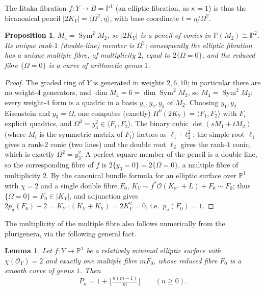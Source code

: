 \documentclass[11pt]{article}
\newtheorem{proposition}[theorem]{Proposition}
\newtheorem{lemma}[theorem]{Lemma}
\theoremstyle{definition}
\DeclareMathOperator{\Sym}{Sym}
\newcommand{\bP}{\mathbb{P}}
\newcommand{\cO}{\mathcal{O}}
\newcommand{\Om}{\Omega}
\begin{document}
The Iitaka fibration $f\colon Y\to B=\bP^1$ (an elliptic fibration, as
$\kappa=1$) is thus the bicanonical pencil $|2K_Y|=\langle\Om^2,\eta\rangle$,
with base coordinate $t=\eta/\Om^2$.

\begin{proposition}\label{prop:fibration}
$M_4=\Sym^2 M_2$, so $|2K_Y|$ is a pencil of conics in $\bP(M_2)\cong\bP^2$.
Its unique rank-$1$ (double-line) member is $\Om^2$; consequently the elliptic
fibration has a unique multiple fibre, of multiplicity $2$, equal to
$2\{\Om=0\}$, and the reduced fibre $\{\Om=0\}$ is a curve of arithmetic genus
$1$.
\end{proposition}

\begin{proof}
The graded ring of $Y$ is generated in weights $2,6,10$; in particular there
are no weight-$4$ generators, and $\dim M_4=6=\dim\Sym^2 M_2$, so
$M_4=\Sym^2M_2$: every weight-$4$ form is a quadric in a basis $y_1,y_2,y_3$
of $M_2$. Choosing $y_1,y_2$ Eisenstein and $y_3=\Om$, one computes (exactly)
$H^0(2K_Y)=\langle F_1,F_2\rangle$ with $F_i$ explicit quadrics, and
$\Om^2=y_3^2\in\langle F_1,F_2\rangle$. The binary cubic
$\det(sM_1+tM_2)$ (where $M_i$ is the symmetric matrix of $F_i$) factors as
$\ell_1\cdot\ell_2^2$; the simple root $\ell_1$ gives a rank-$2$ conic (two
lines) and the double root $\ell_2$ gives the rank-$1$ conic, which is exactly
$\Om^2=y_3^2$. A perfect-square member of the pencil is a double line, so the
corresponding fibre of $f$ is $2\{y_3=0\}=2\{\Om=0\}$, a multiple fibre of
multiplicity $2$. By the canonical bundle formula for an elliptic surface over
$\bP^1$ with $\chi=2$ and a single double fibre $F_0$,
$K_Y\sim f^*\cO(K_{\bP^1}+L)+F_0\sim F_0$; thus $\{\Om=0\}=F_0\in|K_Y|$, and
adjunction gives $2p_a(F_0)-2=K_Y\cdot(K_Y+K_Y)=2K_Y^2=0$, i.e.\ $p_a(F_0)=1$.
\end{proof}

The multiplicity of the multiple fibre also follows numerically from the
plurigenera, via the following general fact.

\begin{lemma}\label{lem:mult}
Let $f\colon Y\to\bP^1$ be a relatively minimal elliptic surface with
$\chi(\cO_Y)=2$ and exactly one multiple fibre $mF_0$, whose reduced fibre $F_0$
is a smooth curve of genus $1$. Then
\[
  P_n=1+\Big\lfloor\tfrac{n(m-1)}{m}\Big\rfloor\qquad(n\ge0).
\]
\end{lemma}
\end{document}
